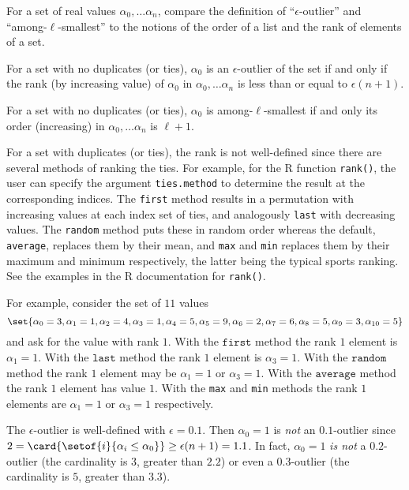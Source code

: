 \documentclass[12pt]{article}
\begin{document}
\begin{exercise}
    For a set of real values \( \alpha_0, \dots \alpha_n \), compare the
    definition of ``\( \epsilon \)-outlier'' and ``among-\( \ell \)-smallest''
    to the notions of the order of a list and the rank of elements of a
    set.
\end{exercise}
\begin{solution}
    For a set with no duplicates (or ties), \( \alpha_0 \) is an \(
    \epsilon \)-outlier of the set if and only if the rank (by
    increasing value) of \( \alpha_0 \) in \( \alpha_0, \dots \alpha_n \)
    is less than or equal to \( \epsilon(n+1) \).

    For a set with no duplicates (or ties), \( \alpha_0 \) is among-\(
    \ell \)-smallest if and only its order (increasing) in \( \alpha_0,
    \dots \alpha_n \) is \( \ell + 1 \).

    For a set with duplicates (or ties), the rank is not well-defined
    since there are several methods of ranking the ties.  For example,
    for the R function \texttt{rank()}, the user can specify the
    argument \texttt{ties.method} to determine the result at the
    corresponding indices.  The \texttt{first} method results in a
    permutation with increasing values at each index set of ties, and
    analogously \texttt{last} with decreasing values.  The \texttt{random}
    method puts these in random order whereas the default, \texttt{average},
    replaces them by their mean, and \texttt{max} and \texttt{min}
    replaces them by their maximum and minimum respectively, the latter
    being the typical sports ranking.  See the examples in the R
    documentation for \texttt{rank()}.

    For example, consider the set of \( 11 \) values
    \[
      \set{\alpha_0 =
    3, \alpha_1 = 1, \alpha_2 = 4, \alpha_3 = 1, \alpha_4 = 5, \alpha_5
    = 9, \alpha_6 = 2, \alpha_7 = 6, \alpha_8 = 5, \alpha_9 = 3, \alpha_
    {10} = 5}
    \]
    and ask for the value with rank \( 1 \).  With the \(
    \texttt{first} \) method the rank \( 1 \) element is \( \alpha_1 = 1
    \).  With the \( \texttt{last} \) method the rank \( 1 \) element is
    \( \alpha_3 = 1 \).  With the \( \texttt{random} \) method the rank \(
    1 \) element may be \( \alpha_1 = 1 \) or \( \alpha_3 = 1 \).  With
    the \( \texttt{average} \) method the rank \( 1 \) element has value
    \( 1 \).  With the \texttt{max} and \texttt{min} methods the rank \(
    1 \) elements are \( \alpha_1 = 1 \) or \( \alpha_3 = 1 \)
    respectively.

    The \( \epsilon \)-outlier is well-defined with \( \epsilon = 0.1 \).
    Then \( \alpha_0 = 1 \) is \emph{not} an \( 0.1 \)-outlier since \(
    2 = \card{%
    \setof{i}{\alpha_i \le \alpha_0}} \ge \epsilon(n+1) = 1.1 \).  In
    fact, \( \alpha_0 = 1 \) \emph{is not} a \( 0.2 \)-outlier (the
    cardinality is \( 3 \), greater than \( 2.2 \)) or even a \( 0.3 \)-outlier
    (the cardinality is \( 5 \), greater than \( 3.3 \)).
\end{solution}
\end{document}
